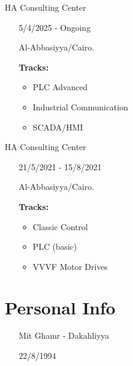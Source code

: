 \documentclass[9pt]{extarticle}
\begin{document}
\begin{paracol}{2}
\begin{expbox}[title = {\bfseries\raggedright Industrial Automation (PLC advanced)}]
	 {\bfseries\raggedright HA Consulting Center} 
	\begin{itemize}[nosep,align = left, leftmargin = !, labelwidth = ]\raggedright
		\item[\faCalendar*] 5/4/2025 - Ongoing
		\item[\faMapMarker*] Al-Abbasiyya/Cairo. 
		\item[{\bfseries Tracks:}] \phantom{.}
		\begin{itemize}[nosep,leftmargin = *, align = left] \raggedright
			\item PLC Advanced
			\item Industrial Communication
			\item SCADA/HMI
		\end{itemize}
	\end{itemize}
	\end{expbox}
\begin{expbox}[title = {\bfseries\raggedright Industrial Automation (Classic control + PLC Basic Diploma)}]
	 {\bfseries\raggedright HA Consulting Center} 
	\begin{itemize}[nosep,align = left, leftmargin = !, labelwidth = ]\raggedright
		\item[\faCalendar*] 21/5/2021 - 15/8/2021
		\item[\faMapMarker*] Al-Abbasiyya/Cairo. 
		\item[{\bfseries Tracks:}] \phantom{.}
		\begin{itemize}[nosep,leftmargin = *, align = left] \raggedright
			\item Classic Control
			\item PLC (basic)
			\item VVVF Motor Drives
		\end{itemize}
	\end{itemize}
	\end{expbox}

\section{Personal Info}

\begin{itemize}[nosep,align = left, leftmargin = !, labelwidth = ]\raggedright

            \item[\faMapMarker*] Mit Ghamr - Dakahliyya
            \item[\faBirthdayCake] 22/8/1994\end{itemize}

\end{paracol}
\end{document}
